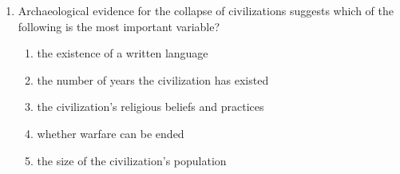 \documentclass[12pt]{article}
\begin{document}
\begin{enumerate}[label=\arabic*.]
\begin{enumerate}[label=(\alph*)]
    \item formal government
    \item monumental earthworks
    \item urban centers
    \item a permanent military
\end{enumerate}
\item Archaeological evidence for the collapse of civilizations suggests which of the following is the most important variable?
\begin{enumerate}[label=(\alph*)]
    \item the existence of a written language
    \item the number of years the civilization has existed
    \item the civilization's religious beliefs and practices
    \item whether warfare can be ended
    \item the size of the civilization's population
\end{enumerate}
\end{enumerate}
\end{document}
